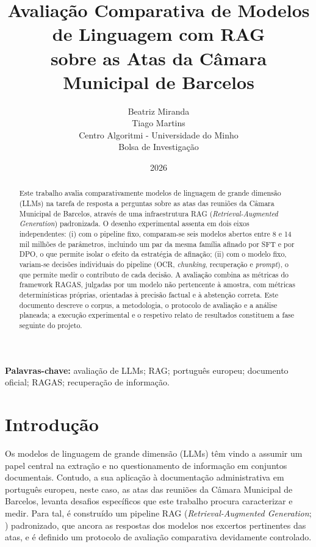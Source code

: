 \documentclass[11pt]{article}
\title{Avaliação Comparativa de Modelos de Linguagem com RAG\\
sobre as Atas da Câmara Municipal de Barcelos}
\author{
    Beatriz Miranda\\
    Tiago Martins\\[4pt]
    \small Centro Algoritmi - Universidade do Minho\\
    \small Bolsa de Investigação
}
\date{2026}
\renewcommand{\_}{\textunderscore\allowbreak}
\begin{document}
\maketitle

\begin{abstract}
Este trabalho avalia comparativamente modelos de linguagem de grande dimensão (LLMs) na tarefa de resposta a perguntas sobre as atas das reuniões da Câmara Municipal de Barcelos, através de uma infraestrutura RAG (\textit{Retrieval-Augmented Generation}) padronizada. O desenho experimental assenta em dois eixos independentes: (i) com o pipeline fixo, comparam-se seis modelos abertos entre 8 e 14 mil milhões de parâmetros, incluindo um par da mesma família afinado por SFT e por DPO, o que permite isolar o efeito da estratégia de afinação; (ii) com o modelo fixo, variam-se decisões individuais do pipeline (OCR, \textit{chunking}, recuperação e \textit{prompt}), o que permite medir o contributo de cada decisão. A avaliação combina as métricas do framework RAGAS, julgadas por um modelo não pertencente à amostra, com métricas determinísticas próprias, orientadas à precisão factual e à abstenção correta. Este documento descreve o corpus, a metodologia, o protocolo de avaliação e a análise planeada; a execução experimental e o respetivo relato de resultados constituem a fase seguinte do projeto.
\end{abstract}

\noindent\textbf{Palavras-chave:} avaliação de LLMs; RAG; português europeu; documento oficial; RAGAS; recuperação de informação.

\newpage

\tableofcontents
\newpage

\section{Introdução}
\label{sec:intro}

Os modelos de linguagem de grande dimensão (LLMs) têm vindo a assumir um papel central na extração e no questionamento de informação em conjuntos documentais. Contudo, a sua aplicação à documentação administrativa em português europeu, neste caso, as atas das reuniões da Câmara Municipal de Barcelos, levanta desafios específicos que este trabalho procura caracterizar e medir. Para tal, é construído um pipeline RAG (\textit{Retrieval-Augmented Generation}; \cite{lewis}) padronizado, que ancora as respostas dos modelos nos excertos pertinentes das atas, e é definido um protocolo de avaliação comparativa devidamente controlado.
\end{document}
